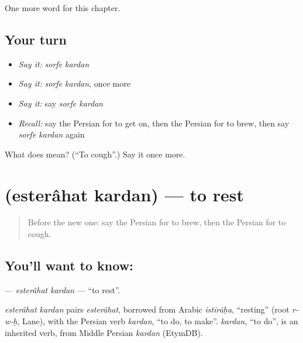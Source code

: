 \begin{grammarlens}[title={What you've built}]
One more word for this chapter.
\end{grammarlens}

\subsection*{Your turn}
\begin{itemize}
\raggedright
  \item \emph{Say it:} \emph{sorfe kardan}
  \item \emph{Say it:} \emph{sorfe kardan}, once more
  \item \emph{Say it:} say \emph{sorfe kardan}
  \item \emph{Recall:} say the Persian for to get on, then the Persian for to brew, then say \emph{sorfe kardan} again
\end{itemize}

\begin{tcolorbox}[breakable,colback=teal!4,colframe=teal!35!black,title={Before you move on}]
What does   mean? (\textquotedblleft{}To cough\textquotedblright{}.) Say it once more.
\end{tcolorbox}
\section[\texorpdfstring{\fa{استراحت} \fa{کردن} (esterâhat kardan)}{استراحت کردن (esterâhat kardan)}]{  (esterâhat kardan) — to rest}

\label{lesson:FA-C218-esterahat-kardan}



\begin{quote}
Before the new one: say the Persian for to brew, then the Persian for to cough.
\end{quote}

\subsection*{You'll want to know:  }
\textbf{ } — \emph{esterâhat kardan} — \textquotedblleft{}to rest\textquotedblright{}.

\begin{cousinweb}
\emph{esterâhat kardan} pairs \emph{esterâhat}, borrowed from Arabic \emph{istirāḥa}, \textquotedblleft{}resting\textquotedblright{} (root \emph{r-w-ḥ}, Lane), with the Persian verb \emph{kardan}, \textquotedblleft{}to do, to make\textquotedblright{}. \emph{kardan}, \textquotedblleft{}to do\textquotedblright{}, is an inherited verb, from Middle Persian \emph{kardan} (EtymDB).
\end{cousinweb}

